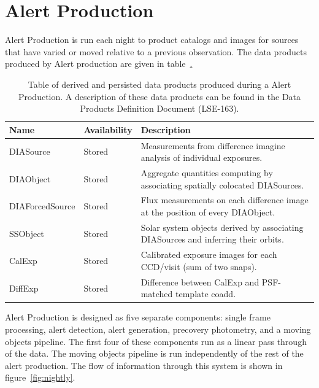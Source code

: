 \section{Alert Production}
\label{sec:ap}



Alert Production is run each night to product catalogs and images for sources that have varied or moved relative to a previous observation.  The data products produced by Alert production are given in  table~\hyperref[table:ap_data_products].

\begin{table}
\small
\begin{tabularx}{\textwidth}{ | l | l | X | }
  \hline
  {\bf Name} & {\bf Availability} & {\bf Description} \\
  \hline
  DIASource & Stored &
  Measurements from difference imagine analysis of individual exposures. \\
  \hline
  DIAObject& Stored &
  Aggregate quantities computing by associating spatially colocated DIASources. \\
  \hline
  DIAForcedSource & Stored &
  Flux measurements on each difference image at the position of every DIAObject. \\
  \hline
  SSObject & Stored &
  Solar system objects derived by associating DIASources and inferring their orbits. \\
  \hline
  CalExp & Stored &
  Calibrated exposure images for each CCD/visit (sum of two snaps). \\
  \hline
  DiffExp & Stored &
  Difference between CalExp and PSF-matched template coadd. \\
  \hline
\end{tabularx}
\caption{Table of derived and persisted data products produced during a Alert Production.  A description of these data products can be found in the Data Products Definition Document (LSE-163).
\label{table:ap_data_products}}
\end{table}


Alert Production is designed as five separate components: single frame
processing, alert detection, alert generation, precovery photometry,
and a moving objects pipeline. The first four of these components run
as a linear pass through of the data. The moving objects pipeline is
run independently of the rest of the alert production. The flow of
information through this system is shown in figure~\ref{fig:nightly}.

